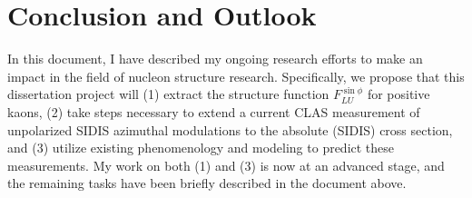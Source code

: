 \section{Conclusion and Outlook}
In this document, I have described my ongoing research efforts to make an impact in the field of nucleon structure research.  Specifically, we propose that this dissertation project will (1) extract the structure function $F_{LU}^{\sin\phi}$ for positive kaons, (2) take steps necessary to extend a current CLAS measurement of unpolarized SIDIS azimuthal modulations to the absolute (SIDIS) cross section, and (3) utilize existing phenomenology and modeling to predict these measurements.  My work on both (1) and (3) is now at an advanced stage, and the remaining tasks have been briefly described in the document above.  
